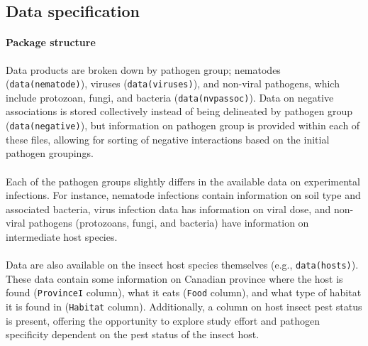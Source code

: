 \documentclass[12pt]{article}
\begin{document}
\subsection*{Data specification}



\paragraph*{Package structure}

Data products are broken down by pathogen group; nematodes (\texttt{data(nematode)}), viruses (\texttt{data(viruses)}), and non-viral pathogens, which include protozoan, fungi, and bacteria (\texttt{data(nvpassoc)}). Data on negative associations is stored collectively instead of being delineated by pathogen group (\texttt{data(negative)}), but information on pathogen group is provided within each of these files, allowing for sorting of negative interactions based on the initial pathogen groupings. 


\paragraph*{}
Each of the pathogen groups slightly differs in the available data on experimental infections. For instance, nematode infections contain information on soil type and associated bacteria, virus infection data has information on viral dose, and non-viral pathogens (protozoans, fungi, and bacteria) have information on intermediate host species.


\paragraph*{}
Data are also available on the insect host species themselves (e.g., \texttt{data(hosts)}). These data contain some information on Canadian province where the host is found (\texttt{ProvinceI} column), what it eats (\texttt{Food} column), and what type of habitat it is found in (\texttt{Habitat} column). Additionally, a column on host insect pest status is present, offering the opportunity to explore study effort and pathogen specificity dependent on the pest status of the insect host. 
\end{document}
